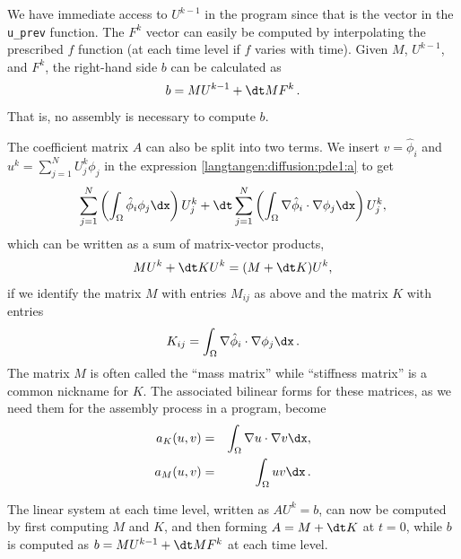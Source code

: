 We have immediate access to $U^{k-1}$ 
in the program since that is the vector
in the {\fontsize{10pt}{10pt}\verb!u_prev!} function. The $F^k$ vector can easily be
computed by interpolating the prescribed $f$ function (at each time level if
$f$ varies with time). Given $M$, $U^{k-1}$, and $F^k$, the right-hand side
$b$ can be calculated as
\[ b = MU^{k-1} + {\dt} MF^k \langtangenep\]
That is, no assembly is necessary to compute $b$.

The coefficient matrix $A$ can also be split into two terms. 
We insert $v=\hat\phi_i$ and $u^k = \sum_{j=1}^N U^k_j\phi_j$ in
the expression \eqref{langtangen:diffusion:pde1:a} to get
\[ \sum_{j=1}^N \left(\int_\Omega \hat\phi_i\phi_j\dx\right)U^k_j + {\dt}
\sum_{j=1}^N \left(\int_\Omega \nabla\hat\phi_i\cdot\nabla\phi_j\dx\right)U^k_j,
\]
which can be written as a sum of matrix-vector products,
\[ MU^k + {\dt} KU^k = (M + {\dt} K)U^k,\]
if we identify the matrix $M$ with entries $M_{ij}$ as above and
the matrix $K$ with entries
\begin{equation} K_{ij} = \int_\Omega \nabla\hat\phi_i\cdot\nabla\phi_j\dx\langtangenep
\end{equation}
The matrix $M$ is often called the ``mass matrix'' while ``stiffness matrix''
is a common nickname for $K$. The associated bilinear forms for these
matrices, as we need them for the assembly process in a \fenics{}
program, become
\begin{eqnarray}
a_K(u,v) &=& \int_\Omega\nabla u\cdot\nabla v\dx,
\label{langtangen:diffusion:pde1:aK}\\
a_M(u,v) &=& \int_\Omega uv\dx \label{langtangen:diffusion:pde1:aM}\langtangenep
\end{eqnarray}

The linear system at each time level, written as $AU^k=b$,
can now be computed by first computing $M$ and $K$, and then forming
$A=M+{\dt} K$ at $t=0$, while $b$ is computed as
$b=MU^{k-1} + {\dt}MF^k$ at each time level.

